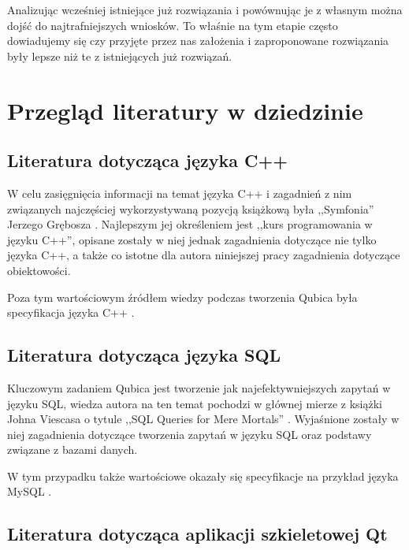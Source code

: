 \documentclass[12pt]{report}
\begin{document}
Analizując wcześniej istniejące już rozwiązania i powównując je z własnym można dojść do najtrafniejszych wniosków. To właśnie na tym etapie często dowiadujemy się czy
przyjęte przez nas założenia i zaproponowane rozwiązania były lepsze niż te z istniejących już rozwiązań. 

\section{Przegląd literatury w dziedzinie}

\subsection{Literatura dotycząca języka C++}

W celu zasięgnięcia informacji na temat języka C++ i zagadnień z nim związanych najczęściej wykorzystywaną pozycją książkową była ,,Symfonia'' Jerzego Grębosza \cite{symfonia}.
Najlepszym jej określeniem jest ,,kurs programowania w języku C++'', opisane zostały w niej jednak zagadnienia dotyczące nie tylko języka C++, a także co istotne dla
autora niniejszej pracy zagadnienia dotyczące obiektowości.

Poza tym wartościowym źródłem wiedzy podczas tworzenia Qubica była specyfikacja języka C++ \cite{cpp}.

\subsection{Literatura dotycząca języka SQL}

Kluczowym zadaniem Qubica jest tworzenie jak najefektywniejszych zapytań w języku SQL, wiedza autora na ten temat pochodzi w głównej mierze z książki Johna Viescasa o
tytule ,,SQL Queries for Mere Mortals'' \cite{sql}. Wyjaśnione zostały w niej zagadnienia dotyczące tworzenia zapytań w języku SQL oraz podstawy związane z bazami danych.

W tym przypadku także wartościowe okazały się specyfikacje na przykład języka MySQL \cite{mysql}.

\subsection{Literatura dotycząca aplikacji szkieletowej Qt}










\end{document}
